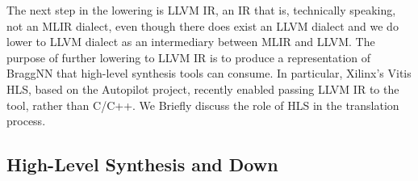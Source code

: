 The next step in the lowering is LLVM IR, an IR that is, technically speaking, not an MLIR dialect, even though there does exist an LLVM dialect and we do lower to LLVM dialect as an intermediary between MLIR and LLVM.
The purpose of further lowering to LLVM IR is to produce a representation of BraggNN that high-level synthesis tools can consume.
In particular, Xilinx's Vitis HLS, based on the Autopilot project\cite{Zhang2008}, recently enabled passing LLVM IR to the tool, rather than C/C++.
We Briefly discuss the role of HLS in the translation process.

\subsection{High-Level Synthesis and Down}\label{subsec:hlsdown}

